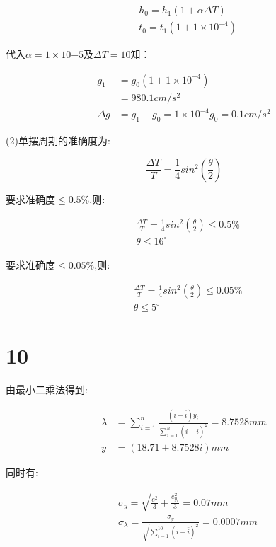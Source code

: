 \documentclass[a4paper,10pt,notitlepage]{report}
\begin{document}
\begin{align}
	&h_0=h_1(1+\alpha \Delta T) \\
	&t_0=t_1(1+1\times 10^{-4})
\end{align}

	代入$\alpha=1\times 10{-5}$及$\Delta T=10$知：

\begin{align}
	g_1&=g_0(1+1\times 10^{-4}) \\
	&=980.1 cm/s^2 \\
	\Delta g&=g_1-g_0=1\times 10^{-4} g_0=0.1cm/s^2
\end{align}

	(2)单摆周期的准确度为: 
	
\begin{equation}
\frac{\Delta T}{T}=\frac{1}{4} sin^2(\frac{\theta}{2})
\end{equation}

	要求准确度$\leq 0.5\%$,则: 

\begin{align}
	&\frac{\Delta T}{T}=\frac{1}{4} sin^2(\frac{\theta}{2})\leq 0.5\%\\
	& \theta \leq 16^\circ
\end{align}

	要求准确度$\leq 0.05\%$,则:

\begin{align}
	&\frac{\Delta T}{T}=\frac{1}{4} sin^2(\frac{\theta}{2})\leq 0.05\%\\
	& \theta \leq 5^\circ
\end{align}

\section*{10}

	由最小二乘法得到:
	
\begin{align}
	\lambda&=\sum_{i=1}^n {\frac{(i-\bar{i})y_i}{\sum_{i=1}^n {(i-\bar{i})^2}}} =8.7528mm \\
	y &= (18.71 + 8.7528i) mm
\end{align}

	同时有:

\begin{align}
	&\sigma_y=\sqrt{\frac{e^2}{3}+\frac{e_{y_i}^2}{3}}=0.07mm\\
	&\sigma_{\lambda}=\frac{\sigma_y}{\sqrt{\sum_{i=1}^{10} {(i-\bar{i})^2}}}=0.0007mm
\end{align}
\end{document}
